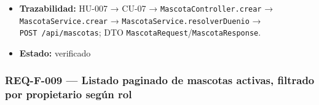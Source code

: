 \documentclass[
  spanish,
]{article}
\begin{document}
\begin{itemize}
  (criterio 3);
  \texttt{crear\allowbreak{}Mascota\allowbreak{}Con\allowbreak{}Rol\allowbreak{}Insuficiente\allowbreak{}Devuelve\allowbreak{}Problem\allowbreak{}Detail} (criterio
  4); \texttt{crear\allowbreak{}Mascota\allowbreak{}Con\allowbreak{}Campos\allowbreak{}Invalidos\allowbreak{}Devuelve422} (criterio 5).
\item
  \textbf{Trazabilidad:} HU-007 → CU-07 →
  \texttt{Mascota\allowbreak{}Controller.\allowbreak{}crear} → \texttt{Mascota\allowbreak{}Service.\allowbreak{}crear} →
  \texttt{Mascota\allowbreak{}Service.\allowbreak{}resolver\allowbreak{}Duenio} → \texttt{POST\ /\allowbreak{}api/\allowbreak{}mascotas};
  DTO \texttt{Mascota\allowbreak{}Request}/\texttt{Mascota\allowbreak{}Response}.
\item
  \textbf{Estado:} verificado
\end{itemize}

\subsubsection{REQ-F-009 --- Listado paginado de mascotas activas,
filtrado por propietario según
rol}\label{req-f-009-listado-paginado-de-mascotas-activas-filtrado-por-propietario-seguxfan-rol}
\end{document}
